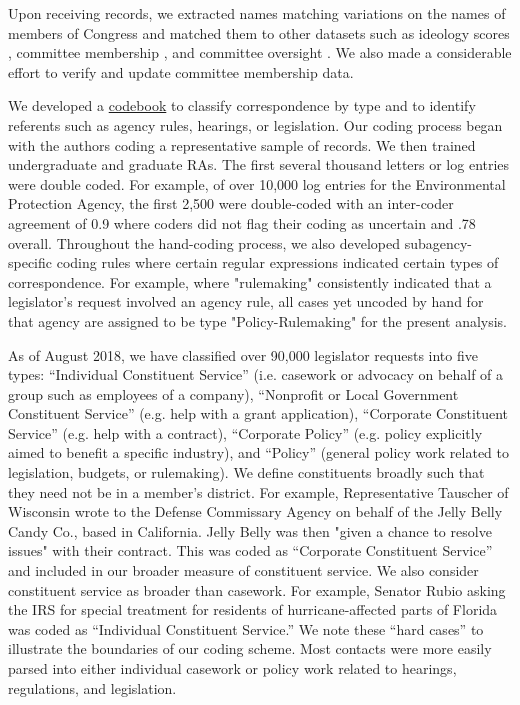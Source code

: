 \documentclass{article}
\begin{document}
Upon receiving records, we extracted names matching variations on the names of members of Congress and matched them to other datasets such as ideology scores \citep{dwnominate2018}, committee membership \citep{StewartWoon2017}, and committee oversight \citep{LewisSelin2012}. We also made a considerable effort to verify and update committee membership data. 

We developed a \href{https://docs.google.com/document/d/1fJxjXjAyRL9vX-16fSsH29anXZc-W74GMf_7BSgWkws/edit}{codebook} to classify correspondence by type and to identify referents such as agency rules, hearings, or legislation. Our coding process began with the authors coding a representative sample of records. We then trained undergraduate and graduate RAs. The first several thousand letters or log entries were double coded. For example, of over 10,000 log entries for the Environmental Protection Agency, the first 2,500 were double-coded with an inter-coder agreement of 0.9 where coders did not flag their coding as uncertain and .78 overall. Throughout the hand-coding process, we also developed subagency-specific coding rules where certain regular expressions indicated certain types of correspondence. For example, where "rulemaking" consistently indicated that a legislator's request involved an agency rule, all cases yet uncoded by hand for that agency are assigned to be type "Policy-Rulemaking" for the present analysis. 

As of August 2018, we have classified over 90,000 legislator requests into five types: ``Individual Constituent Service'' (i.e. casework or advocacy on behalf of a group such as employees of a company), ``Nonprofit or Local Government Constituent Service'' (e.g. help with a grant application), ``Corporate Constituent Service'' (e.g. help with a contract), ``Corporate Policy'' (e.g. policy explicitly aimed to benefit a specific industry), and ``Policy'' (general policy work related to legislation, budgets, or rulemaking). 
We define constituents broadly such that they need not be in a member's district. For example, Representative Tauscher of Wisconsin wrote to the Defense Commissary Agency on behalf of the Jelly Belly Candy Co., based in California. Jelly Belly was then "given a chance to resolve issues" with their contract. This was coded as ``Corporate Constituent Service'' and included in our broader measure of constituent service.  We also consider constituent service as broader than casework. For example, Senator Rubio asking the IRS for special treatment for residents of hurricane-affected parts of Florida was coded as ``Individual Constituent Service.'' We note these ``hard cases'' to illustrate the boundaries of our coding scheme. Most contacts were more easily parsed into either individual casework or policy work related to hearings, regulations, and legislation.
\end{document}
